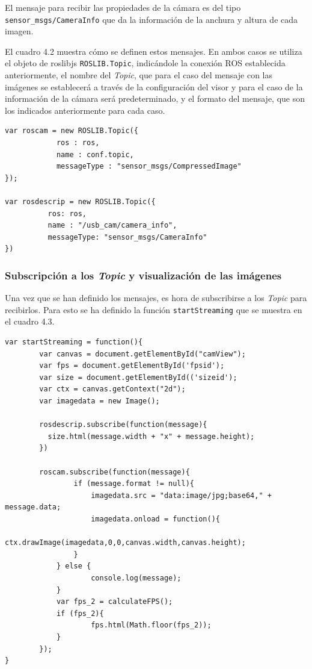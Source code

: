 El mensaje para recibir las propiedades de la cámara es del tipo \texttt{sensor\_msgs/CameraInfo} que da la información de la anchura y altura de cada imagen.

El cuadro 4.2 muestra cómo se definen estos mensajes. En ambos casos se utiliza el objeto de roslibjs \texttt{ROSLIB.Topic}, indicándole la conexión ROS establecida anteriormente, el nombre del \textit{Topic}, que para el caso del mensaje con las imágenes se establecerá a través de la configuración del visor y para el caso de la información de la cámara será predeterminado, y el formato del mensaje, que son los indicados anteriormente para cada caso.

\begin{lstlisting}[caption= Definición de los mensajes ROS, label=cod.mensajescamviz]
var roscam = new ROSLIB.Topic({
            ros : ros,
            name : conf.topic,
            messageType : "sensor_msgs/CompressedImage"
});

var rosdescrip = new ROSLIB.Topic({
          ros: ros,
          name : "/usb_cam/camera_info",
          messageType: "sensor_msgs/CameraInfo"
})
\end{lstlisting}

\subsubsection{Subscripción a los \textit{Topic} y visualización de las imágenes}

Una vez que se han definido los mensajes, es hora de subscribirse a los \textit{Topic} para recibirlos. Para esto se ha definido la función \texttt{startStreaming} que se muestra en el cuadro 4.3.

\begin{lstlisting}[caption= Subscripción y visualización de las imágenes, label=cod.subscribecamviz]
var startStreaming = function(){
        var canvas = document.getElementById("camView");
        var fps = document.getElementById('fpsid');
        var size = document.getElementById(('sizeid');
        var ctx = canvas.getContext("2d");
        var imagedata = new Image();
        
        rosdescrip.subscribe(function(message){
          size.html(message.width + "x" + message.height);
        })
        
        roscam.subscribe(function(message){
        		if (message.format != null){
            		imagedata.src = "data:image/jpg;base64," + message.data;
            		imagedata.onload = function(){
              		ctx.drawImage(imagedata,0,0,canvas.width,canvas.height);
            	}
          	} else {
            		console.log(message);
          	}
          	var fps_2 = calculateFPS();
          	if (fps_2){
             		fps.html(Math.floor(fps_2));
          	}
      	});
}
\end{lstlisting}

